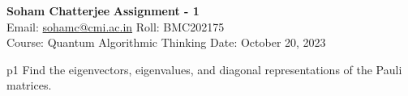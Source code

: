 \documentclass[a4paper, 11pt]{article}
\begin{document}
	
	
\textsf{\noindent \large\textbf{Soham Chatterjee} \hfill \textbf{Assignment - 1}\\
	Email: \href{sohamc@cmi.ac.in}{sohamc@cmi.ac.in} \hfill Roll: BMC202175\\
	\normalsize Course: Quantum Algorithmic Thinking \hfill Date: October 20, 2023}
	
	
\begin{problem}{%
	}{p1%
	}
Find the eigenvectors, eigenvalues, and diagonal representations of the Pauli matrices.		
\end{problem}
	
\end{document}
